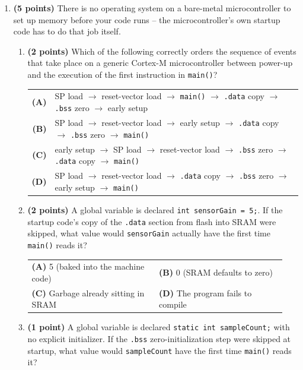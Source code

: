 \documentclass[10pt]{article}
\makeatletter
\newcommand{\mcfour}[4]{%
\begin{center}
\begin{tabular}{@{}p{0.47\linewidth}@{\hspace{0.04\linewidth}}p{0.47\linewidth}@{}}
#1 & #2 \\[3pt]
#3 & #4 \\
\end{tabular}
\end{center}}
\makeatother
\begin{document}
\begin{enumerate}[label=\textbf{\arabic*.}, leftmargin=*, itemsep=3pt]

\item \textbf{(5 points)} There is no operating system on a bare-metal microcontroller to set up memory before your code runs -- the microcontroller's own startup code has to do that job itself.

\begin{enumerate}[label=(\alph*), leftmargin=*, itemsep=3pt]
\item \textbf{(2 points)} Which of the following correctly orders the sequence of events that take place on a generic Cortex-M microcontroller between power-up and the execution of the first instruction in \texttt{main()}?

\begin{center}
\begin{tabular}{@{}rl@{}}
\textbf{(A)} & SP load $\rightarrow$ reset-vector load $\rightarrow$ \texttt{main()} $\rightarrow$ \texttt{.data} copy $\rightarrow$ \texttt{.bss} zero $\rightarrow$ early setup \\
\textbf{(B)} & SP load $\rightarrow$ reset-vector load $\rightarrow$ early setup $\rightarrow$ \texttt{.data} copy $\rightarrow$ \texttt{.bss} zero $\rightarrow$ \texttt{main()} \\
\textbf{(C)} & early setup $\rightarrow$ SP load $\rightarrow$ reset-vector load $\rightarrow$ \texttt{.bss} zero $\rightarrow$ \texttt{.data} copy $\rightarrow$ \texttt{main()} \\
\textbf{(D)} & SP load $\rightarrow$ reset-vector load $\rightarrow$ \texttt{.data} copy $\rightarrow$ \texttt{.bss} zero $\rightarrow$ early setup $\rightarrow$ \texttt{main()} \\
\end{tabular}
\end{center}

\item \textbf{(2 points)} A global variable is declared \texttt{int sensorGain = 5;}. If the startup code's copy of the \texttt{.data} section from flash into SRAM were skipped, what value would \texttt{sensorGain} actually have the first time \texttt{main()} reads it?

\mcfour{\textbf{(A)} 5 (baked into the machine code)}{\textbf{(B)} 0 (SRAM defaults to zero)}{\textbf{(C)} Garbage already sitting in SRAM}{\textbf{(D)} The program fails to compile}

\item \textbf{(1 point)} A global variable is declared \texttt{static int sampleCount;} with no explicit initializer. If the \texttt{.bss} zero-initialization step were skipped at startup, what value would \texttt{sampleCount} have the first time \texttt{main()} reads it?


\end{enumerate}
\end{enumerate}
\end{document}
